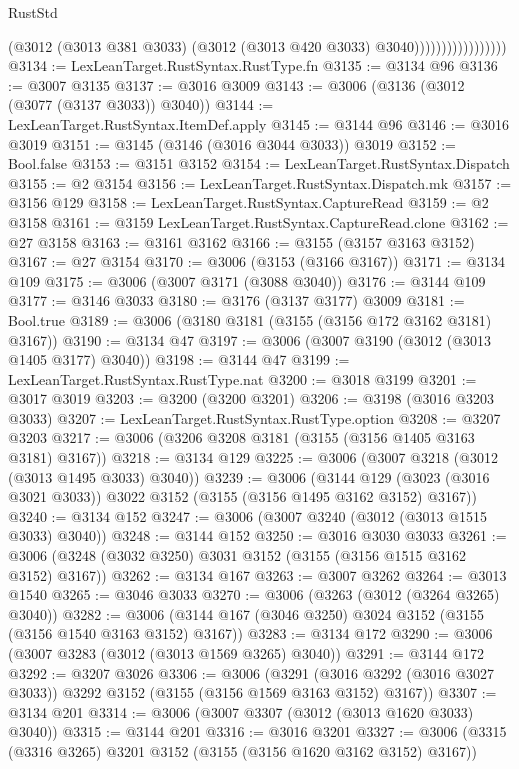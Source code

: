 \begin{lexlean}{RustStd}
\begin{coremodule}
                                  (@3012
                                    (@3013 @381 @3033)
                                    (@3012 (@3013 @420 @3033) @3040)))))))))))))))))
@3134 := LexLeanTarget.RustSyntax.RustType.fn
@3135 := @3134 @96
@3136 := @3007 @3135
@3137 := @3016 @3009
@3143 := @3006 (@3136 (@3012 (@3077 (@3137 @3033)) @3040))
@3144 := LexLeanTarget.RustSyntax.ItemDef.apply
@3145 := @3144 @96
@3146 := @3016 @3019
@3151 := @3145 (@3146 (@3016 @3044 @3033)) @3019
@3152 := Bool.false
@3153 := @3151 @3152
@3154 := LexLeanTarget.RustSyntax.Dispatch
@3155 := @2 @3154
@3156 := LexLeanTarget.RustSyntax.Dispatch.mk
@3157 := @3156 @129
@3158 := LexLeanTarget.RustSyntax.CaptureRead
@3159 := @2 @3158
@3161 := @3159 LexLeanTarget.RustSyntax.CaptureRead.clone
@3162 := @27 @3158
@3163 := @3161 @3162
@3166 := @3155 (@3157 @3163 @3152)
@3167 := @27 @3154
@3170 := @3006 (@3153 (@3166 @3167))
@3171 := @3134 @109
@3175 := @3006 (@3007 @3171 (@3088 @3040))
@3176 := @3144 @109
@3177 := @3146 @3033
@3180 := @3176 (@3137 @3177) @3009
@3181 := Bool.true
@3189 := @3006 (@3180 @3181 (@3155 (@3156 @172 @3162 @3181) @3167))
@3190 := @3134 @47
@3197 := @3006 (@3007 @3190 (@3012 (@3013 @1405 @3177) @3040))
@3198 := @3144 @47
@3199 := LexLeanTarget.RustSyntax.RustType.nat
@3200 := @3018 @3199
@3201 := @3017 @3019
@3203 := @3200 (@3200 @3201)
@3206 := @3198 (@3016 @3203 @3033)
@3207 := LexLeanTarget.RustSyntax.RustType.option
@3208 := @3207 @3203
@3217 := @3006 (@3206 @3208 @3181 (@3155 (@3156 @1405 @3163 @3181) @3167))
@3218 := @3134 @129
@3225 := @3006 (@3007 @3218 (@3012 (@3013 @1495 @3033) @3040))
@3239 := @3006
    (@3144 @129 (@3023 (@3016 @3021 @3033)) @3022 @3152 (@3155 (@3156 @1495 @3162 @3152) @3167))
@3240 := @3134 @152
@3247 := @3006 (@3007 @3240 (@3012 (@3013 @1515 @3033) @3040))
@3248 := @3144 @152
@3250 := @3016 @3030 @3033
@3261 := @3006 (@3248 (@3032 @3250) @3031 @3152 (@3155 (@3156 @1515 @3162 @3152) @3167))
@3262 := @3134 @167
@3263 := @3007 @3262
@3264 := @3013 @1540
@3265 := @3046 @3033
@3270 := @3006 (@3263 (@3012 (@3264 @3265) @3040))
@3282 := @3006 (@3144 @167 (@3046 @3250) @3024 @3152 (@3155 (@3156 @1540 @3163 @3152) @3167))
@3283 := @3134 @172
@3290 := @3006 (@3007 @3283 (@3012 (@3013 @1569 @3265) @3040))
@3291 := @3144 @172
@3292 := @3207 @3026
@3306 := @3006
    (@3291 (@3016 @3292 (@3016 @3027 @3033)) @3292 @3152 (@3155 (@3156 @1569 @3163 @3152) @3167))
@3307 := @3134 @201
@3314 := @3006 (@3007 @3307 (@3012 (@3013 @1620 @3033) @3040))
@3315 := @3144 @201
@3316 := @3016 @3201
@3327 := @3006 (@3315 (@3316 @3265) @3201 @3152 (@3155 (@3156 @1620 @3162 @3152) @3167))

\end{coremodule}
\end{lexlean}
